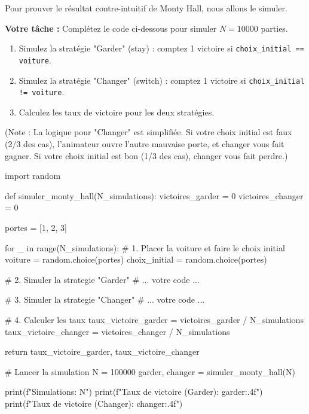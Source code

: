 \begin{exercicebox}
Pour prouver le résultat contre-intuitif de Monty Hall, nous allons le simuler.

\textbf{Votre tâche :}
Complétez le code ci-dessous pour simuler $N=10000$ parties.
\begin{enumerate}
    \item Simulez la stratégie "Garder" (stay) : comptez 1 victoire si \texttt{choix\_initial == voiture}.
    \item Simulez la stratégie "Changer" (switch) : comptez 1 victoire si \texttt{choix\_initial != voiture}.
    \item Calculez les taux de victoire pour les deux stratégies.
\end{enumerate}
(Note : La logique pour "Changer" est simplifiée. Si votre choix initial est faux (2/3 des cas), l'animateur ouvre l'autre mauvaise porte, et changer vous fait gagner. Si votre choix initial est bon (1/3 des cas), changer vous fait perdre.)

\begin{codecell}
import random

def simuler_monty_hall(N_simulations):
    victoires_garder = 0
    victoires_changer = 0
    
    portes = [1, 2, 3]
    
    for _ in range(N_simulations):
        # 1. Placer la voiture et faire le choix initial
        voiture = random.choice(portes)
        choix_initial = random.choice(portes)
        
        # 2. Simuler la strategie "Garder"
        # ... votre code ...
            
        # 3. Simuler la strategie "Changer"
        # ... votre code ...
            
    # 4. Calculer les taux
    taux_victoire_garder = victoires_garder / N_simulations
    taux_victoire_changer = victoires_changer / N_simulations
    
    return taux_victoire_garder, taux_victoire_changer

# Lancer la simulation
N = 100000
garder, changer = simuler_monty_hall(N)

print(f"Simulations: {N}")
print(f"Taux de victoire (Garder): {garder:.4f}")
print(f"Taux de victoire (Changer): {changer:.4f}")
\end{codecell}
\end{exercicebox}